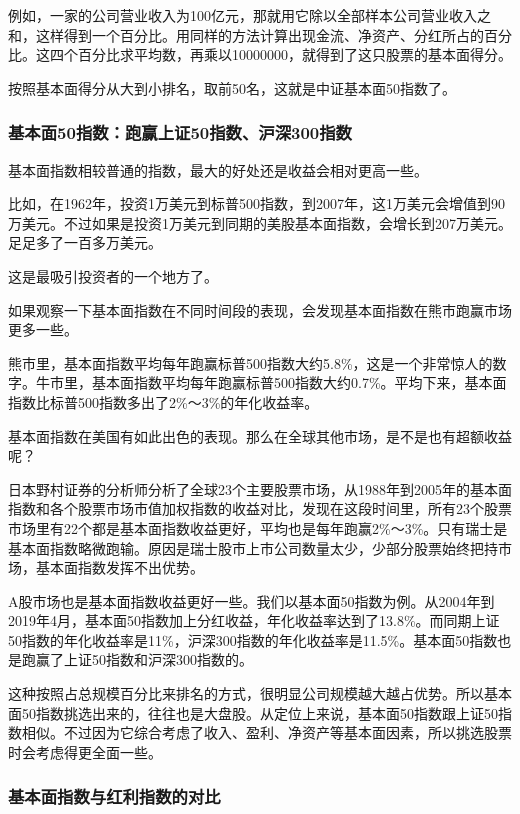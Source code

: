 例如，一家的公司营业收入为100亿元，那就用它除以全部样本公司营业收入之和，这样得到一个百分比。用同样的方法计算出现金流、净资产、分红所占的百分比。这四个百分比求平均数，再乘以10000000，就得到了这只股票的基本面得分。

按照基本面得分从大到小排名，取前50名，这就是中证基本面50指数了。

\subsubsection{基本面50指数：跑赢上证50指数、沪深300指数}

基本面指数相较普通的指数，最大的好处还是收益会相对更高一些。

比如，在1962年，投资1万美元到标普500指数，到2007年，这1万美元会增值到90万美元。不过如果是投资1万美元到同期的美股基本面指数，会增长到207万美元。足足多了一百多万美元。

这是最吸引投资者的一个地方了。

如果观察一下基本面指数在不同时间段的表现，会发现基本面指数在熊市跑赢市场更多一些。

熊市里，基本面指数平均每年跑赢标普500指数大约5.8\%，这是一个非常惊人的数字。牛市里，基本面指数平均每年跑赢标普500指数大约0.7\%。平均下来，基本面指数比标普500指数多出了2\%～3\%的年化收益率。

基本面指数在美国有如此出色的表现。那么在全球其他市场，是不是也有超额收益呢？

日本野村证券的分析师分析了全球23个主要股票市场，从1988年到2005年的基本面指数和各个股票市场市值加权指数的收益对比，发现在这段时间里，所有23个股票市场里有22个都是基本面指数收益更好，平均也是每年跑赢2\%～3\%。只有瑞士是基本面指数略微跑输。原因是瑞士股市上市公司数量太少，少部分股票始终把持市场，基本面指数发挥不出优势。

A股市场也是基本面指数收益更好一些。我们以基本面50指数为例。从2004年到2019年4月，基本面50指数加上分红收益，年化收益率达到了13.8\%。而同期上证50指数的年化收益率是11\%，沪深300指数的年化收益率是11.5\%。基本面50指数也是跑赢了上证50指数和沪深300指数的。

这种按照占总规模百分比来排名的方式，很明显公司规模越大越占优势。所以基本面50指数挑选出来的，往往也是大盘股。从定位上来说，基本面50指数跟上证50指数相似。不过因为它综合考虑了收入、盈利、净资产等基本面因素，所以挑选股票时会考虑得更全面一些。

\subsubsection{基本面指数与红利指数的对比}

